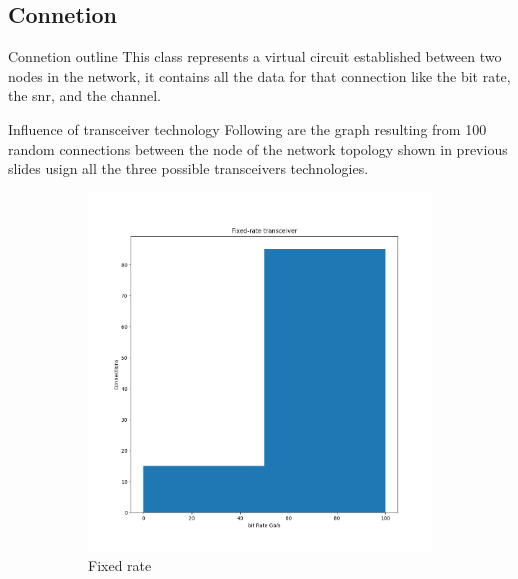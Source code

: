 \documentclass{beamer}
\begin{document}
	\subsection{Connetion}
	\begin{frame}{Connetion outline}
		This class represents a virtual circuit established between two nodes in the network, it contains all the data for that connection like the bit rate, the snr, and the channel.
	\end{frame}
	\begin{frame}{Influence of transceiver technology}
		Following are the graph resulting from 100 random connections between the node of the network topology shown in previous slides usign all the three possible transceivers technologies.
		\begin{figure}[h]
			\centering
			\begin{subfigure}{0.31\textwidth}
				\includegraphics[width=\linewidth]{Pictures/Fixed rate cons.png}
				\caption{Fixed rate}
			\end{subfigure}
			\hspace*{\fill}
			\begin{subfigure}{0.31\textwidth}

\end{subfigure}
\end{figure}
\end{frame}
\end{document}
